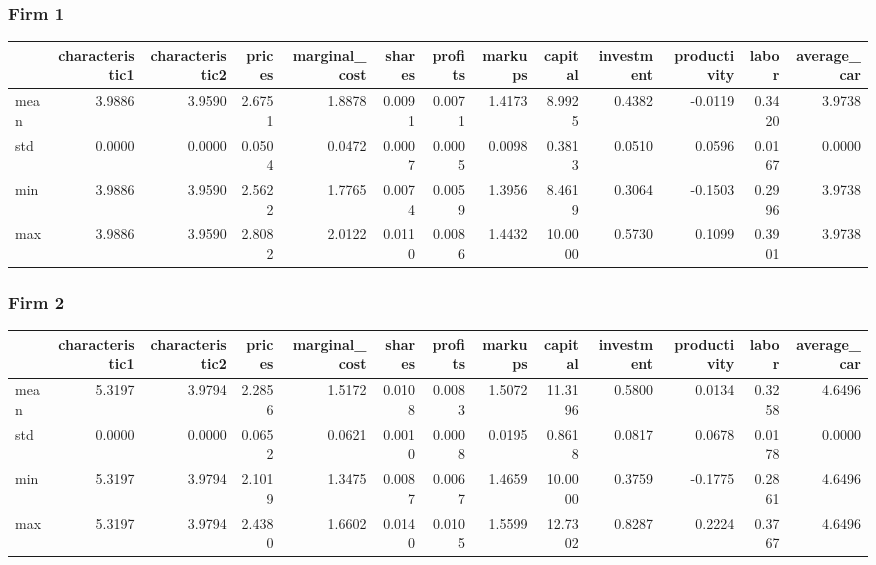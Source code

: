  \subsubsection*{Firm 1}
\begin{tabular}{lrrrrrrrrrrrr}
\toprule
{} &  characteristic1 &  characteristic2 &  prices &  marginal\_cost &  shares &  profits &  markups &  capital &  investment &  productivity &  labor &  average\_car \\
\midrule
mean &           3.9886 &           3.9590 &  2.6751 &         1.8878 &  0.0091 &   0.0071 &   1.4173 &   8.9925 &      0.4382 &       -0.0119 & 0.3420 &       3.9738 \\
std  &           0.0000 &           0.0000 &  0.0504 &         0.0472 &  0.0007 &   0.0005 &   0.0098 &   0.3813 &      0.0510 &        0.0596 & 0.0167 &       0.0000 \\
min  &           3.9886 &           3.9590 &  2.5622 &         1.7765 &  0.0074 &   0.0059 &   1.3956 &   8.4619 &      0.3064 &       -0.1503 & 0.2996 &       3.9738 \\
max  &           3.9886 &           3.9590 &  2.8082 &         2.0122 &  0.0110 &   0.0086 &   1.4432 &  10.0000 &      0.5730 &        0.1099 & 0.3901 &       3.9738 \\
\bottomrule
\end{tabular}


 \subsubsection*{Firm 2}
\begin{tabular}{lrrrrrrrrrrrr}
\toprule
{} &  characteristic1 &  characteristic2 &  prices &  marginal\_cost &  shares &  profits &  markups &  capital &  investment &  productivity &  labor &  average\_car \\
\midrule
mean &           5.3197 &           3.9794 &  2.2856 &         1.5172 &  0.0108 &   0.0083 &   1.5072 &  11.3196 &      0.5800 &        0.0134 & 0.3258 &       4.6496 \\
std  &           0.0000 &           0.0000 &  0.0652 &         0.0621 &  0.0010 &   0.0008 &   0.0195 &   0.8618 &      0.0817 &        0.0678 & 0.0178 &       0.0000 \\
min  &           5.3197 &           3.9794 &  2.1019 &         1.3475 &  0.0087 &   0.0067 &   1.4659 &  10.0000 &      0.3759 &       -0.1775 & 0.2861 &       4.6496 \\
max  &           5.3197 &           3.9794 &  2.4380 &         1.6602 &  0.0140 &   0.0105 &   1.5599 &  12.7302 &      0.8287 &        0.2224 & 0.3767 &       4.6496 \\
\bottomrule
\end{tabular}


